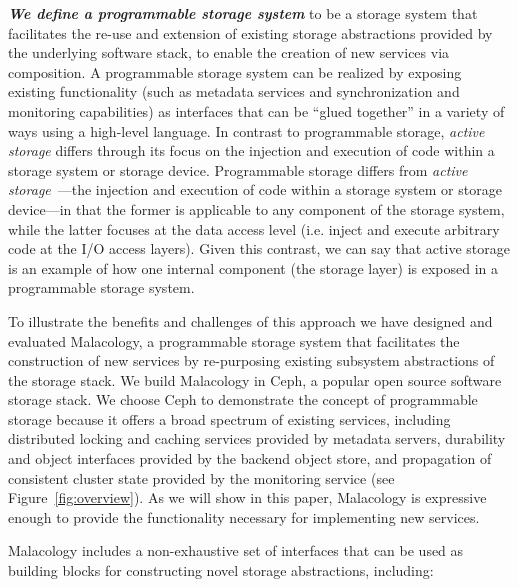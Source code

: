 \documentclass[preprint]{sigplanconf-eurosys}
\begin{document}
{\it \textbf{We define a programmable storage system}} to be a storage system
that facilitates the re-use and extension of existing storage abstractions
provided by the underlying software stack, to enable the creation of new
services via composition.  A programmable storage system can be realized by
exposing existing functionality (such as metadata services and synchronization
and monitoring capabilities) as interfaces that can be ``glued together'' in a
variety of ways using a high-level language. In contrast to programmable
storage, \emph{active storage} differs through its focus on the injection and
execution of code within a storage system or storage device. Programmable
storage differs from \emph{active storage}~\cite{riedel:vldb98}---the injection and
execution of code within a storage system or storage device---in
that the
former is applicable to any component of the storage system, while the latter
focuses at the data access level (i.e. inject and execute arbitrary code at the
I/O access layers). Given this contrast, we can say that active storage is an
example of how one internal component (the storage layer) is exposed in a
programmable storage system.

To illustrate the benefits and challenges of this approach we have designed and
evaluated Malacology, a programmable storage system that facilitates the
construction of new services by re-purposing existing subsystem abstractions of
the storage stack.  We build Malacology in Ceph, a popular open source software
storage stack.  We choose Ceph to demonstrate the concept of programmable
storage because it offers a broad spectrum of existing services, including
distributed locking and caching services provided by metadata servers,
durability and object interfaces provided by the backend object store, and
propagation of consistent cluster state provided by the monitoring service (see
Figure~\ref{fig:overview}). As we will show in this paper, Malacology is
expressive enough to provide the functionality necessary for implementing new
services. 

Malacology includes a non-exhaustive set of interfaces that can be used as
building blocks for constructing novel storage abstractions, including:
\end{document}
